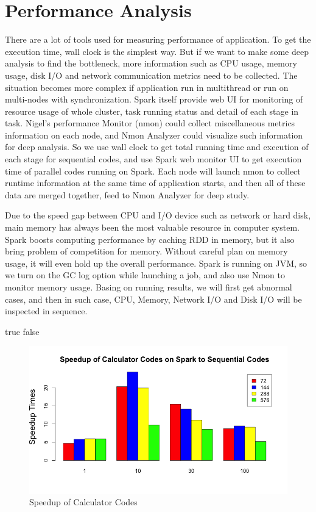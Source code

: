 \section{Performance Analysis}
There are a lot of tools used for measuring performance of application. To get the execution time, wall clock is the simplest way. But if we want to make some deep analysis to find the bottleneck, more information such as CPU usage, memory usage, disk I/O and network communication metrics need to be collected. The situation becomes more complex if application run in multithread or run on multi-nodes with synchronization. Spark itself provide web UI for monitoring of resource usage of whole cluster, task running status and detail of each stage in task. Nigel's performance Monitor (nmon) could collect miscellaneous metrics information on each node, and Nmon Analyzer could visualize such information for deep analysis. So we use wall clock to get total running time and execution of each stage for sequential codes, and use Spark web monitor UI to get execution time of parallel codes running on Spark. Each node will launch nmon to collect runtime information at the same time of application starts, and then all of these data are merged together, feed to Nmon Analyzer for deep study. 

Due to the speed gap between CPU and I/O device such as network or hard disk, main memory has always been the most valuable resource in computer system. Spark boosts computing performance by caching  RDD in memory, but it also bring problem of competition for memory. Without careful plan on memory usage, it will even hold up the overall performance. Spark is running on JVM, so we turn on the GC log option while launching a job, and also use Nmon to monitor memory usage. Basing on running results, we will first get abnormal cases, and then in such case, CPU, Memory, Network I/O and Disk I/O will be inspected in sequence.  

\ifx true false
\begin{figure}[h]
\includegraphics[scale=.60]{figures/CalcSpeedup.png}
\caption{Speedup of Calculator Codes}
\label{CalcSpeedup}
\end{figure}
\fi 



